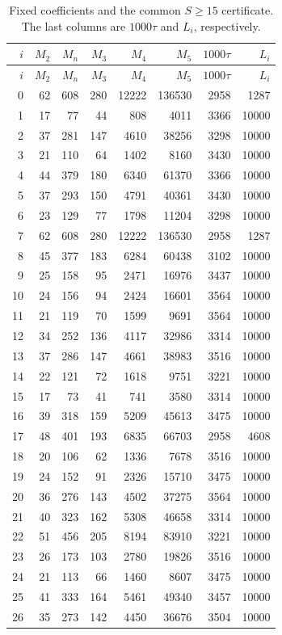\documentclass[12pt]{article}
\numberwithin{equation}{section}
\begin{document}
\endgroup
\begingroup\small
\setlength{\tabcolsep}{4pt}
\begin{longtable}{r|rrrrr|r|r}
\caption{Fixed coefficients and the common $S\ge15$ certificate. The last columns are $1000\tau$ and $L_i$, respectively.}\label{tab:pr-forty-coefficients}\\
$i$&$M_2$&$M_n$&$M_3$&$M_4$&$M_5$&$1000\tau$&$L_i$\\\hline\endfirsthead
$i$&$M_2$&$M_n$&$M_3$&$M_4$&$M_5$&$1000\tau$&$L_i$\\\hline\endhead
0&62&608&280&12222&136530&2958&1287\\
1&17&77&44&808&4011&3366&10000\\
2&37&281&147&4610&38256&3298&10000\\
3&21&110&64&1402&8160&3430&10000\\
4&44&379&180&6340&61370&3366&10000\\
5&37&293&150&4791&40361&3430&10000\\
6&23&129&77&1798&11204&3298&10000\\
7&62&608&280&12222&136530&2958&1287\\
8&45&377&183&6284&60438&3102&10000\\
9&25&158&95&2471&16976&3437&10000\\
10&24&156&94&2424&16601&3564&10000\\
11&21&119&70&1599&9691&3564&10000\\
12&34&252&136&4117&32986&3314&10000\\
13&37&286&147&4661&38983&3516&10000\\
14&22&121&72&1618&9751&3221&10000\\
15&17&73&41&741&3580&3314&10000\\
16&39&318&159&5209&45613&3475&10000\\
17&48&401&193&6835&66703&2958&4608\\
18&20&106&62&1336&7678&3516&10000\\
19&24&152&91&2326&15710&3475&10000\\
20&36&276&143&4502&37275&3564&10000\\
21&40&323&162&5308&46658&3314&10000\\
22&51&456&205&8194&83910&3221&10000\\
23&26&173&103&2780&19826&3516&10000\\
24&21&113&66&1460&8607&3475&10000\\
25&41&333&164&5461&49340&3457&10000\\
26&35&273&142&4450&36676&3504&10000\\

\end{longtable}
\end{document}
